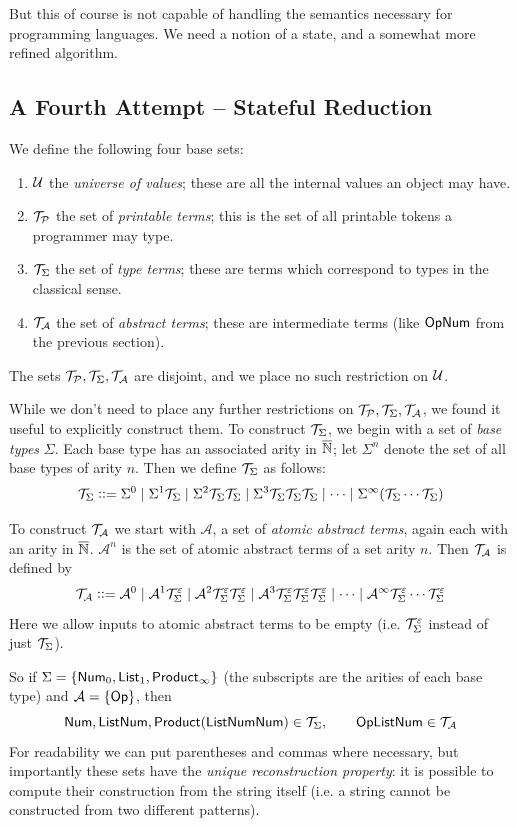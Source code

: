 \documentclass{llncs}
\newcounter{algo}
\begin{document}
But this of course is not capable of handling the semantics necessary for programming languages.
We need a notion of a state, and a somewhat more refined algorithm.

\subsection{A Fourth Attempt -- Stateful Reduction}

We define the following four base sets:
\begin{enumerate}
    \item $\mathcal U$ the \textit{universe of values}; these are all the internal values an object may have.
    \item $\mathcal T_{\mathcal P}$ the set of \textit{printable terms}; this is the set of all printable tokens a programmer may type.
    \item $\mathcal T_{\Sigma}$ the set of \textit{type terms}; these are terms which correspond to types in the classical sense.
    \item $\mathcal T_{\mathcal A}$ the set of \textit{abstract terms}; these are intermediate terms (like $\mathsf{Op}\mathsf{Num}$ from the previous section).
\end{enumerate}
The sets $\mathcal T_{\mathcal P},\mathcal T_{\Sigma},\mathcal T_{\mathcal A}$ are disjoint, and we place no such restriction on $\mathcal U$.

While we don't need to place any further restrictions on $\mathcal T_{\mathcal P},\mathcal T_{\Sigma},\mathcal T_{\mathcal A}$, we found it useful to explicitly construct them.
To construct $\mathcal T_{\Sigma}$, we begin with a set of \textit{base types} $\Sigma$.
Each base type has an associated arity in $\overline{\mathbb N}$; let $\Sigma^n$ denote the set of all base types of arity $n$.
Then we define $\mathcal T_{\Sigma}$ as follows:
\[ \mathcal T_{\Sigma} \mathrel{{\mathop:}{\mathop:}{=}} \Sigma^0 \mid \Sigma^1\mathcal T_{\Sigma} \mid \Sigma^2\mathcal T_{\Sigma}\mathcal T_{\Sigma} \mid \Sigma^3\mathcal T_{\Sigma}\mathcal T_{\Sigma}\mathcal T_{\Sigma} \mid \cdots \mid \Sigma^\infty(\mathcal T_{\Sigma}\cdots\mathcal T_{\Sigma}) \]

To construct $\mathcal T_{\mathcal A}$ we start with $\mathcal A$, a set of \textit{atomic abstract terms}, again each with an arity in $\overline{\mathbb N}$.
$\mathcal A^n$ is the set of atomic abstract terms of a set arity $n$.
Then $\mathcal T_{\mathcal A}$ is defined by
\[ \mathcal T_{\mathcal A} \mathrel{{\mathop:}{\mathop:}{=}} \mathcal A^0\mid\mathcal A^1\mathcal T_{\Sigma}^\varepsilon\mid\mathcal A^2\mathcal T_{\Sigma}^\varepsilon\mathcal T_{\Sigma}^\varepsilon\mid\mathcal A^3\mathcal T_{\Sigma}^\varepsilon\mathcal T_{\Sigma}^\varepsilon\mathcal T_{\Sigma}^\varepsilon\mid\cdots\mid
\mathcal A^\infty\mathcal T_{\Sigma}^\varepsilon\cdots\mathcal T_{\Sigma}^\varepsilon \]
Here we allow inputs to atomic abstract terms to be empty (i.e. $\mathcal T_{\Sigma}^\varepsilon$ instead of just $\mathcal T_{\Sigma}$).

So if $\Sigma=\set{\NUM_0,\LIST_1,\PRODUCT_\infty}$ (the subscripts are the arities of each base type) and $\mathcal A=\set{\OP}$, then
\[ \mathsf{Num},\mathsf{List}\mathsf{Num},\mathsf{Product}(\mathsf{List}\mathsf{Num}\mathsf{Num})\in\mathcal T_{\Sigma},\qquad \mathsf{Op}\mathsf{List}\mathsf{Num}\in\mathcal T_{\mathcal A} \]
For readability we can put parentheses and commas where necessary, but importantly these sets have the \textit{unique reconstruction property}: it is possible to compute their construction from the
string itself (i.e. a string cannot be constructed from two different patterns).
\end{document}
